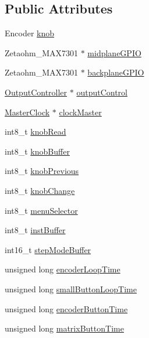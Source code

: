 \subsection*{Public Attributes}
\begin{DoxyCompactItemize}
\item 
Encoder \hyperlink{class_input_module_a70e9413a995052805e5c1e6962e1ec46}{knob}
\item 
Zetaohm\+\_\+\+M\+A\+X7301 $\ast$ \hyperlink{class_input_module_ad23720995ebd07355df926bb18e2260d}{midplane\+G\+P\+IO}
\item 
Zetaohm\+\_\+\+M\+A\+X7301 $\ast$ \hyperlink{class_input_module_a433abde922dee6f2abed80710f49a294}{backplane\+G\+P\+IO}
\item 
\hyperlink{class_output_controller}{Output\+Controller} $\ast$ \hyperlink{class_input_module_ad1019ec5aac3175710630718e056e471}{output\+Control}
\item 
\hyperlink{class_master_clock}{Master\+Clock} $\ast$ \hyperlink{class_input_module_aff739621e5d47367263551f43d98b94b}{clock\+Master}
\item 
int8\+\_\+t \hyperlink{class_input_module_a0d7bca8e1d85982108bc2b1c8a9a41fd}{knob\+Read}
\item 
int8\+\_\+t \hyperlink{class_input_module_a6015af9178f42735dd65a308fd132cea}{knob\+Buffer}
\item 
int8\+\_\+t \hyperlink{class_input_module_ad66cbf5057aa15d9428ddb0a6936543a}{knob\+Previous}
\item 
int8\+\_\+t \hyperlink{class_input_module_aa71dde7943b36a879ea305285c042e09}{knob\+Change}
\item 
int8\+\_\+t \hyperlink{class_input_module_a0116c65513c2c09f3e09cdf55e55c4cd}{menu\+Selector}
\item 
int8\+\_\+t \hyperlink{class_input_module_af11a3cf014306369d13bc79c3f5e1bcb}{inst\+Buffer}
\item 
int16\+\_\+t \hyperlink{class_input_module_a0197f1734ab95dd812a7747c9c2374b5}{step\+Mode\+Buffer}
\item 
unsigned long \hyperlink{class_input_module_a8479fea0b1f501250aa5026844d6a1a9}{encoder\+Loop\+Time}
\item 
unsigned long \hyperlink{class_input_module_ad8ba561dc4d0372e46a5b8a0e0eb82d9}{small\+Button\+Loop\+Time}
\item 
unsigned long \hyperlink{class_input_module_a56b62ba8836c0fb6ed93ca126bf9a02d}{encoder\+Button\+Time}
\item 
unsigned long \hyperlink{class_input_module_ae4cc83ddf8ca352a05aef5d737e57bc1}{matrix\+Button\+Time}
\end{DoxyCompactItemize}
